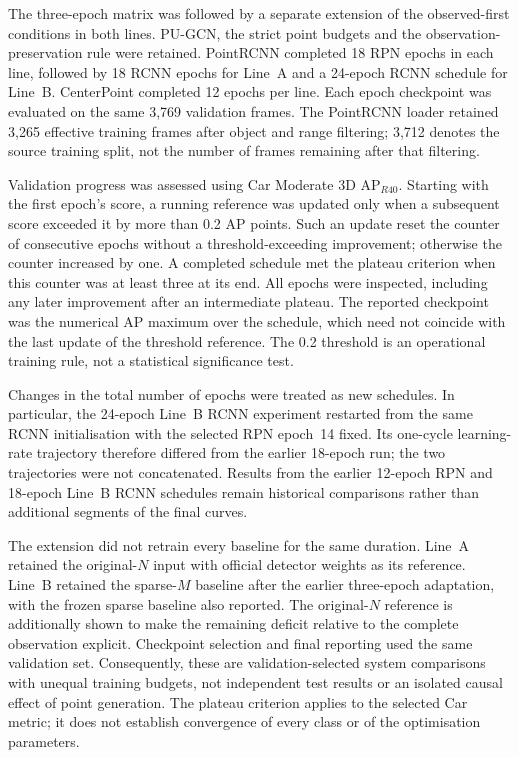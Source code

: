 The three-epoch matrix was followed by a separate extension of the
observed-first conditions in both lines. PU-GCN, the strict point budgets
and the observation-preservation rule were retained. PointRCNN completed
18 RPN epochs in each line, followed by 18 RCNN epochs for Line~A and a
24-epoch RCNN schedule for Line~B. CenterPoint completed 12 epochs per
line. Each epoch checkpoint was evaluated on the same 3,769 validation
frames. The PointRCNN loader retained 3,265 effective training frames
after object and range filtering; 3,712 denotes the source training
split, not the number of frames remaining after that filtering.

Validation progress was assessed using Car Moderate 3D AP$_{R40}$.
Starting with the first epoch's score, a running reference was updated
only when a subsequent score exceeded it by more than 0.2 AP points.
Such an update reset the counter of consecutive epochs without a
threshold-exceeding improvement; otherwise the counter increased by
one. A completed schedule met the plateau criterion when this counter
was at least three at its end. All epochs were inspected, including any
later improvement after an intermediate plateau. The reported checkpoint
was the numerical AP maximum over the schedule, which need not coincide
with the last update of the threshold reference. The 0.2 threshold is
an operational training rule, not a statistical significance test.

Changes in the total number of epochs were treated as new schedules.
In particular, the 24-epoch Line~B RCNN experiment restarted from the
same RCNN initialisation with the selected RPN epoch~14 fixed. Its
one-cycle learning-rate trajectory therefore differed from the earlier
18-epoch run; the two trajectories were not concatenated. Results from
the earlier 12-epoch RPN and 18-epoch Line~B RCNN schedules remain
historical comparisons rather than additional segments of the final
curves.

The extension did not retrain every baseline for the same duration.
Line~A retained the original-$N$ input with official detector weights
as its reference. Line~B retained the sparse-$M$ baseline after the
earlier three-epoch adaptation, with the frozen sparse baseline also
reported. The original-$N$ reference is additionally shown to make the
remaining deficit relative to the complete observation explicit.
Checkpoint selection and final reporting used the same validation set.
Consequently, these are validation-selected system comparisons with
unequal training budgets, not independent test results or an isolated
causal effect of point generation. The plateau criterion applies to the
selected Car metric; it does not establish convergence of every class
or of the optimisation parameters.
